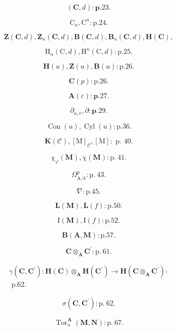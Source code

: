 
\[
(\mathbf {C}, d): \mathbf {p}. 2 3.
\]

\[
\mathrm{C} _ {n}, \mathrm{C} ^ {n}: \mathrm{p}. 2 4.
\]

\[
\mathbf {Z} (\mathbf {C}, d), \mathbf {Z} _ {n} (\mathbf {C}, d), \mathbf {B} (\mathbf {C}, d), \mathbf {B} _ {n} (\mathbf {C}, d), \mathbf {H} (\mathbf {C}),
\]

\[
\mathrm{H} _ {n} (\mathrm{C}, d), \mathrm{H} ^ {n} (\mathrm{C}, d): \mathrm{p}. 2 5.
\]

\[
\mathbf {H} (u), \mathbf {Z} (u), \mathbf {B} (u): \mathrm{p.26}.
\]

\[
\mathbf {C} (p): \mathrm{p.26}.
\]

\[
\mathbf {A} (\varepsilon): \mathbf {p}. 2 7.
\]

\[
\partial_ {u, v}, \partial : \mathbf {p}. 2 9.
\]

\[
\operatorname{Con} (u), \operatorname{Cyl} (u): \mathrm{p.36}.
\]

\[
\mathbf {K} (\mathcal {C}), [ \mathrm{M} ] _ {\mathcal {C}}, [ \mathrm{M} ]: \text { p. } 4 0.
\]

\[
\chi_ {\varphi} (\mathbf {M}), \chi (\mathbf {M}): \mathrm{p.~41}.
\]

\[
\Omega_ {\mathrm{A} / k} ^ {p}: \mathrm{p.~43.}
\]

\[
\nabla : \mathrm{p}. 4 5.
\]

\[
\mathbf {L} (\mathbf {M}), \mathbf {L} (f): \mathrm{p.} 5 0.
\]

\[
\mathrm{I} (\mathbf {M}), \mathrm{I} (f): \mathrm{p}. 5 2.
\]

\[
\mathbf {B} (\mathbf {A}, \mathbf {M}): \mathrm{p.} 5 7.
\]

\[
\mathbf {C} \otimes_ {\mathbf {A}} \mathbf {C} ^ {\prime}: \mathrm{p.~61}.
\]

\[
\begin{array}{l}\gamma (\mathbf {C}, \mathbf {C} ^ {\prime}): \mathbf {H} (\mathbf {C}) \otimes_ {\mathbf {A}} \mathbf {H} (\mathbf {C} ^ {\prime}) \rightarrow \mathbf {H} (\mathbf {C} \otimes_ {\mathbf {A}} \mathbf {C} ^ {\prime}):\\\text { p.62. }\end{array}
\]

\[
\sigma (\mathbf {C}, \mathbf {C} ^ {\prime}): \mathrm{p.~62.}
\]

\[
\operatorname{Tor} _ {n} ^ {\mathbf {A}} (\mathbf {M}, \mathbf {N}): \mathrm{p.~67}.
\]

